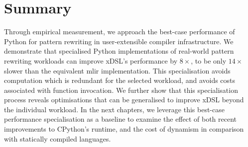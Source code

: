 


\section{Summary}
\label{sec:specialising-summary}


Through empirical measurement, we approach the best-case performance of Python for pattern rewriting in user-extensible compiler infrastructure.
We demonstrate that specialised Python implementations of real-world pattern rewriting workloads can improve xDSL's performance by $8\times$, to be only $14\times$ slower than the equivalent \ac{mlir} implementation. This specialisation avoids computation which is redundant for the selected workload, and avoids costs associated with function invocation.
We further show that this specialisation process reveals optimisations that can be generalised to improve xDSL beyond the individual workload.
%
In the next chapters, we leverage this best-case performance specialisation as a baseline to examine the effect of both recent improvements to CPython's runtime, and the cost of dynamism in comparison with statically compiled languages.
